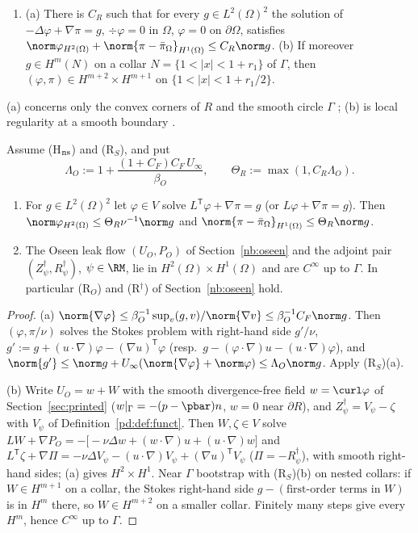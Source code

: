 \begin{enumerate}
\item[(R$_S$)] (a) There is $C_R$ such that for every $g\in L^2(\Omega)^2$ the solution of $-\Delta\varphi+\nabla\pi=g$, $\div\varphi=0$ in $\Omega$,
$\varphi=0$ on $\partial\Omega$, satisfies $\norm\varphi_{H^2(\Omega)}+\norm{\pi-\bar\pi_\Omega}_{H^1(\Omega)}\le C_R\norm g$.
(b) If moreover $g\in H^m(N)$ on a collar $N=\{1<|x|<1+r_1\}$ of $\Gamma$, then $(\varphi,\pi)\in H^{m+2}\times H^{m+1}$ on $\{1<|x|<1+r_1/2\}$.
\end{enumerate}
(a) concerns only the convex corners of $R$ and the smooth circle $\Gamma$ \cite{Dauge1989}; (b) is local regularity at a smooth boundary
\cite{Galdi}. %

\begin{lemma}\label{n2:reg}
Assume (H$_{\rm ns}$) and (R$_S$), and put
\[
\Lambda_O:=1+\frac{(1+C_F)C_F\,U_\infty}{\beta_O},\qquad \Theta_R:=\max(1,C_R\Lambda_O).
\]
\begin{enumerate}[label=(\alph*)]
\item For $g\in L^2(\Omega)^2$ let $\varphi\in V$ solve $L^{\mathsf T}\varphi+\nabla\pi=g$ (or $L\varphi+\nabla\pi=g$). Then
$\norm\varphi_{H^2(\Omega)}\le\Theta_R\nu^{-1}\norm g$ and $\norm{\pi-\bar\pi_\Omega}_{H^1(\Omega)}\le\Theta_R\norm g$.
\item The Oseen leak flow $(U_O,P_O)$ of Section~\ref{nb:oseen} and the adjoint pair $(Z^\dagger_\psi,R^\dagger_\psi)$, $\psi\in\RM$, lie in
$H^2(\Omega)\times H^1(\Omega)$ and are $C^\infty$ up to $\Gamma$. In particular (R$_O$) and (R$^\dagger$) of Section~\ref{nb:oseen} hold.
\end{enumerate}
\end{lemma}

\begin{proof}
(a) $\norm{\nabla\varphi}\le\beta_O^{-1}\sup_v(g,v)/\norm{\nabla v}\le\beta_O^{-1}C_F\norm g$. Then $(\varphi,\pi/\nu)$ solves the Stokes
problem with right-hand side $g'/\nu$, $g':=g+(u\cdot\nabla)\varphi-(\nabla u)^{\mathsf T}\varphi$ (resp.\ $g-(\varphi\cdot\nabla)u-(u\cdot\nabla)\varphi$),
and $\norm{g'}\le\norm g+U_\infty(\norm{\nabla\varphi}+\norm\varphi)\le\Lambda_O\norm g$. Apply (R$_S$)(a).

(b) Write $U_O=w+W$ with the smooth divergence-free field $w=\curl\varphi$ of Section~\ref{sec:printed} ($w|_\Gamma=-(p-\pbar)n$, $w=0$
near $\partial R$), and $Z^\dagger_\psi=V_\psi-\zeta$ with $V_\psi$ of Definition~\ref{pd:def:funct}. Then $W,\zeta\in V$ solve
$LW+\nabla P_O=-\bigl[-\nu\Delta w+(w\cdot\nabla)u+(u\cdot\nabla)w\bigr]$ and $L^{\mathsf T}\zeta+\nabla\Pi=-\nu\Delta V_\psi-(u\cdot\nabla)V_\psi+(\nabla u)^{\mathsf T}V_\psi$
($\Pi=-R^\dagger_\psi$), with smooth right-hand sides; (a) gives $H^2\times H^1$. Near $\Gamma$ bootstrap with (R$_S$)(b) on nested collars:
if $W\in H^{m+1}$ on a collar, the Stokes right-hand side $g-(\text{first-order terms in }W)$ is in $H^m$ there, so $W\in H^{m+2}$
on a smaller collar. Finitely many steps give every $H^m$, hence $C^\infty$ up to $\Gamma$.
\end{proof}

